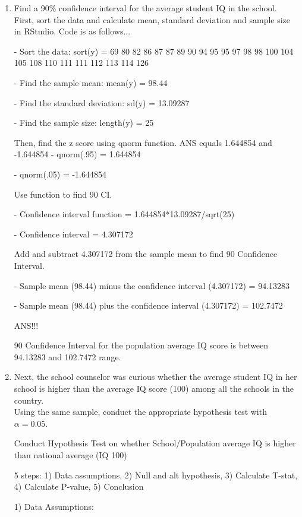 \documentclass[12pt,letterpaper]{article}
\begin{document}
\begin{enumerate}
	\item Find a 90\% confidence interval for the average student IQ in the school.\\

 First, sort the data and calculate mean, standard deviation and sample size in RStudio.
	Code is as follows...
	
	- Sort the data: sort(y) = 69  80  82  86  87  87  89  90  94  95  95  97  98  98 100 104 105 108 110 111 111 112 113 114 126
	
	 - Find the sample mean: mean(y) = 98.44
	
	- Find the standard deviation: sd(y) = 13.09287
	
	 - Find the sample size: length(y) = 25
	
Then, find the z score using qnorm function. ANS equals 1.644854 and -1.644854
	- qnorm(.95) = 1.644854
	
	- qnorm(.05) = -1.644854

Use function to find 90 CI. 
	
	- Confidence interval function = 1.644854*13.09287/sqrt(25)
	
	- Confidence interval = 4.307172

Add and subtract 4.307172 from the sample mean to find 90 Confidence Interval.
	
	- Sample mean (98.44) minus the confidence interval (4.307172) = 94.13283
	
	- Sample mean (98.44) plus the confidence interval (4.307172) = 102.7472

	ANS!!!    
	
	90 Confidence Interval  for the population average IQ score is between 94.13283 and 102.7472 range. 
	 
	\item Next, the school counselor was curious  whether  the average student IQ in her school is higher than the average IQ score (100) among all the schools in the country.\\ 
	
	\noindent Using the same sample, conduct the appropriate hypothesis test with $\alpha=0.05$.
	
	Conduct Hypothesis Test on whether School/Population average IQ is higher than national average (IQ 100)
	
	 5 steps: 1) Data assumptions, 2) Null and alt hypothesis, 3) Calculate T-stat, 4) Calculate P-value, 5) Conclusion
	
	 1) Data Assumptions: 
	 

\end{enumerate}
\end{document}
